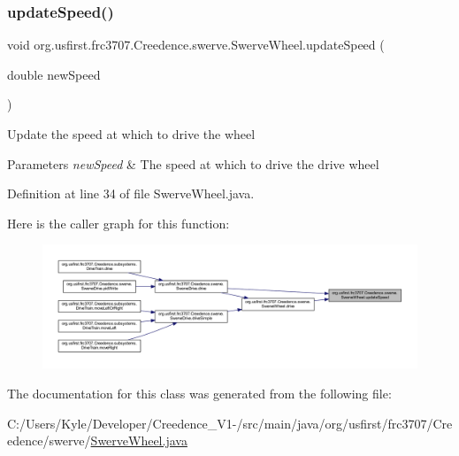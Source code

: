 \subsubsection{\texorpdfstring{updateSpeed()}{updateSpeed()}}
{\footnotesize\ttfamily void org.\+usfirst.\+frc3707.\+Creedence.\+swerve.\+Swerve\+Wheel.\+update\+Speed (\begin{DoxyParamCaption}\item[{double}]{new\+Speed }\end{DoxyParamCaption})}

Update the speed at which to drive the wheel


\begin{DoxyParams}{Parameters}
{\em new\+Speed} & The speed at which to drive the drive wheel \\
\hline
\end{DoxyParams}


Definition at line 34 of file Swerve\+Wheel.\+java.

Here is the caller graph for this function\+:
\nopagebreak
\begin{figure}[H]
\begin{center}
\leavevmode
\includegraphics[width=350pt]{classorg_1_1usfirst_1_1frc3707_1_1_creedence_1_1swerve_1_1_swerve_wheel_ac7a7a649c8d0d48991bbab310c6f87b1_icgraph}
\end{center}
\end{figure}


The documentation for this class was generated from the following file\+:\begin{DoxyCompactItemize}
\item 
C\+:/\+Users/\+Kyle/\+Developer/\+Creedence\+\_\+\+V1-\//src/main/java/org/usfirst/frc3707/\+Creedence/swerve/\mbox{\hyperlink{_swerve_wheel_8java}{Swerve\+Wheel.\+java}}\end{DoxyCompactItemize}
